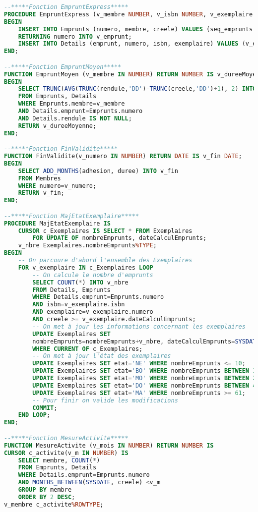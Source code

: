 \documentclass[10pt, oneside]{article}
\begin{document}
\begin{lstlisting}[language=sql, title=Question 12, label=QV12]
--*****Fonction EmpruntExpress*****
PROCEDURE EmpruntExpress (v_membre NUMBER, v_isbn NUMBER, v_exemplaire NUMBER) AS v_emprunt Emprunts.numero%TYPE;
BEGIN
	INSERT INTO Emprunts (numero, membre, creele) VALUES (seq_emprunts.nextval, v_membre, SYSDATE)
	RETURNING numero INTO v_emprunt;
	INSERT INTO Details (emprunt, numero, isbn, exemplaire) VALUES (v_emprunt, 1, v_isbn, v_exemplaire);
END;

--*****Fonction EmpruntMoyen*****
FUNCTION EmpruntMoyen (v_membre IN NUMBER) RETURN NUMBER IS v_dureeMoyenne NUMBER;
BEGIN 
	SELECT TRUNC(AVG(TRUNC(rendule,'DD')-TRUNC(creele,'DD')+1), 2) INTO v_dureeMoyenne
	FROM Emprunts, Details
	WHERE Emprunts.membre=v_membre
	AND Details.emprunt=Emprunts.numero
	AND Details.rendule IS NOT NULL;
	RETURN v_dureeMoyenne;
END;

--*****Fonction FinValidite*****
FUNCTION FinValidite(v_numero IN NUMBER) RETURN DATE IS v_fin DATE;
BEGIN
	SELECT ADD_MONTHS(adhesion, duree) INTO v_fin
	FROM Membres
	WHERE numero=v_numero;
	RETURN v_fin;
END;

--*****Fonction MajEtatExemplaire*****
PROCEDURE MajEtatExemplaire IS 
	CURSOR c_Exemplaires IS SELECT * FROM Exemplaires
		FOR UPDATE OF nombreEmprunts, dateCalculEmprunts;
	v_nbre Exemplaires.nombreEmprunts%TYPE;
BEGIN 
	-- On parcoure d'abord l'ensemble des Exemplaires
	FOR v_exemplaire IN c_Exemplaires LOOP
		-- On calcule le nombre d'emprunts
		SELECT COUNT(*) INTO v_nbre
		FROM Details, Emprunts
		WHERE Details.emprunt=Emprunts.numero
		AND isbn=v_exemplaire.isbn
		AND exemplaire=v_exemplaire.numero
		AND creele >= v_exemplaire.dateCalculEmprunts;
		-- On met à jour les informations concernant les exemplaires
		UPDATE Exemplaires SET
		nombreEmprunts=nombreEmprunts+v_nbre, dateCalculEmprunts=SYSDATE
		WHERE CURRENT OF c_Exemplaires;
		-- On met à jour l'état des exemplaires
		UPDATE Exemplaires SET etat='NE' WHERE nombreEmprunts <= 10;
		UPDATE Exemplaires SET etat='BO' WHERE nombreEmprunts BETWEEN 11 AND 25;
		UPDATE Exemplaires SET etat='MO' WHERE nombreEmprunts BETWEEN 26 AND 40;
		UPDATE Exemplaires SET etat='DO' WHERE nombreEmprunts BETWEEN 41 AND 60;
		UPDATE Exemplaires SET etat='MA' WHERE nombreEmprunts >= 61;
		-- Pour finir on valide les modifications
		COMMIT;
	END LOOP;
END;

--*****Fonction MesureActivite*****
FUNCTION MesureActivite (v_mois IN NUMBER) RETURN NUMBER IS
CURSOR c_activite(v_m IN NUMBER) IS
	SELECT membre, COUNT(*)
	FROM Emprunts, Details
	WHERE Details.emprunt=Emprunts.numero
	AND MONTHS_BETWEEN(SYSDATE, creele) <v_m
	GROUP BY membre
	ORDER BY 2 DESC;
v_membre c_activite%ROWTYPE;


\end{lstlisting}
\end{document}
